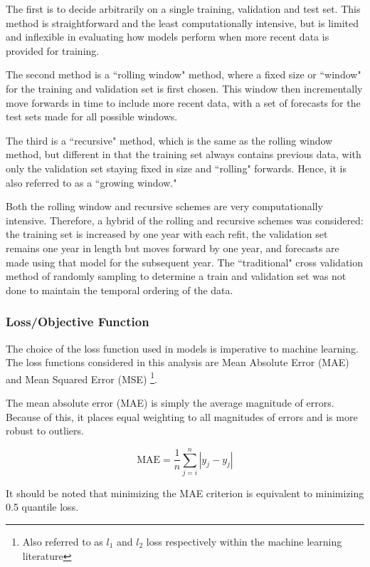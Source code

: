 \documentclass[11pt, a4paper, table]{article}
\begin{document}
The first is to decide arbitrarily on a single training, validation and test set. This method is straightforward and the least computationally intensive, but is limited and inflexible in evaluating how models perform when more recent data is provided for training. 

The second method is a ``rolling window" method, where a fixed size or ``window" for the training and validation set is first chosen. This window then incrementally move forwards in time to include more recent data, with a set of forecasts for the test sets made for all possible windows.

The third is a ``recursive" method, which is the same as the rolling window method, but different in that the training set always contains previous data, with only the validation set staying fixed in size and ``rolling" forwards. Hence, it is also referred to as a ``growing window."

Both the rolling window and recursive schemes are very computationally intensive. Therefore, a hybrid of the rolling and recursive schemes was considered: the training set is increased by one year with each refit, the validation set remains one year in length but moves forward by one year, and forecasts are made using that model for the subsequent year. The ``traditional" cross validation method of randomly sampling to determine a train and validation set was not done to maintain the temporal ordering of the data.

\subsubsection{Loss/Objective Function}
\label{loss_function}
The choice of the loss function used in models is imperative to machine learning. The loss functions considered in this analysis are Mean Absolute Error (MAE) and Mean Squared Error (MSE) \footnote{Also referred to as $l_1$ and $l_2$ loss respectively within the machine learning literature}.

The mean absolute error (MAE) is simply the average magnitude of errors. Because of this, it places equal weighting to all magnitudes of errors and is more robust to outliers. 

\begin{equation}
	\text{MAE} = \frac{1}{n} \sum_{j = i}^{n} |y_j - \hat{y_j}|
\end{equation}

It should be noted that minimizing the MAE criterion is equivalent to minimizing 0.5 quantile loss.
\end{document}
